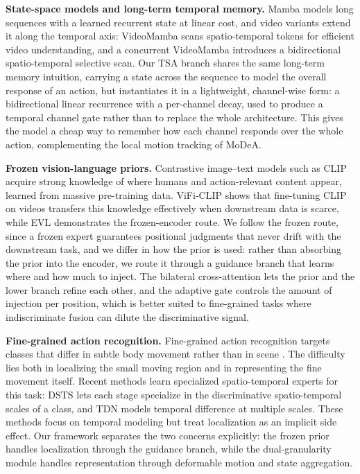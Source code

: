\textbf{State-space models and long-term temporal memory.}
Mamba \cite{dao2023mamba} models long sequences with a learned recurrent
state at linear cost, and video variants extend it along the temporal axis:
VideoMamba \cite{li2024videomamba} scans spatio-temporal tokens for efficient
video understanding, and a concurrent VideoMamba \cite{videomamba2024}
introduces a
bidirectional spatio-temporal selective scan. Our TSA branch shares the same
long-term memory intuition, carrying a state across the sequence to model the
overall response of an action, but instantiates it in a lightweight,
channel-wise form: a bidirectional linear recurrence with a per-channel decay,
used to produce a temporal channel gate rather than to replace the whole
architecture. This gives the model a cheap way to remember how each channel
responds over the whole action, complementing the local motion tracking of
MoDeA.

\textbf{Frozen vision-language priors.}
Contrastive image--text models such as CLIP \cite{radford2021clip} acquire
strong knowledge of where humans and action-relevant content appear, learned
from massive pre-training data. ViFi-CLIP \cite{rasheed2023vificlip} shows
that fine-tuning CLIP on videos transfers this knowledge effectively when
downstream data is scarce, while EVL \cite{lin2022evl} demonstrates the
frozen-encoder route. We follow the frozen route, since a frozen expert
guarantees positional judgments that never drift with the downstream task,
and we differ in how the prior is used: rather than absorbing the prior into
the encoder, we route it through a guidance branch that learns where and how
much to inject. The bilateral cross-attention lets the prior and the lower
branch refine each other, and the adaptive gate controls the amount of
injection per position, which is better suited to fine-grained tasks where
indiscriminate fusion can dilute the discriminative signal.

\textbf{Fine-grained action recognition.}
Fine-grained action recognition targets classes that differ in subtle body
movement rather than in scene \cite{diving48}. The difficulty
lies both in localizing the small moving region and in representing the fine
movement itself. Recent methods learn specialized spatio-temporal experts for
this task: DSTS \cite{li2022dsts} lets each stage specialize in the
discriminative spatio-temporal scales of a class, and TDN \cite{wang2021tdn}
models temporal difference at multiple scales. These methods focus on
temporal modeling but treat localization as an implicit side effect. Our
framework separates the two concerns explicitly: the frozen prior handles
localization through the guidance branch, while the dual-granularity module
handles representation through deformable motion and state aggregation.
